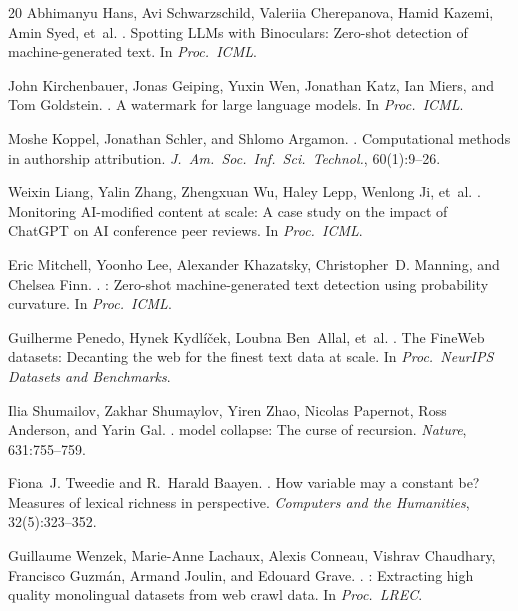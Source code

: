 \documentclass[11pt]{article}
\begin{document}
\begin{thebibliography}{20}
Abhimanyu Hans, Avi Schwarzschild, Valeriia Cherepanova, Hamid Kazemi, Amin Syed, et~al.
.
\newblock Spotting {LLM}s with {B}inoculars: Zero-shot detection of machine-generated text.
\newblock In \emph{Proc.\ ICML}.

John Kirchenbauer, Jonas Geiping, Yuxin Wen, Jonathan Katz, Ian Miers, and Tom Goldstein.
.
\newblock A watermark for large language models.
\newblock In \emph{Proc.\ ICML}.

Moshe Koppel, Jonathan Schler, and Shlomo Argamon.
.
\newblock Computational methods in authorship attribution.
\newblock \emph{J.\ Am.\ Soc.\ Inf.\ Sci.\ Technol.}, 60(1):9--26.

Weixin Liang, Yalin Zhang, Zhengxuan Wu, Haley Lepp, Wenlong Ji, et~al.
.
\newblock Monitoring {AI}-modified content at scale: A case study on the impact of {ChatGPT} on {AI} conference peer reviews.
\newblock In \emph{Proc.\ ICML}.

Eric Mitchell, Yoonho Lee, Alexander Khazatsky, Christopher~D. Manning, and Chelsea Finn.
.
: Zero-shot machine-generated text detection using probability curvature.
\newblock In \emph{Proc.\ ICML}.

Guilherme Penedo, Hynek Kydl{\'i}{\v{c}}ek, Loubna Ben~Allal, et~al.
.
\newblock The {FineWeb} datasets: Decanting the web for the finest text data at scale.
\newblock In \emph{Proc.\ NeurIPS Datasets and Benchmarks}.

Ilia Shumailov, Zakhar Shumaylov, Yiren Zhao, Nicolas Papernot, Ross Anderson, and Yarin Gal.
.
 model collapse: The curse of recursion.
\newblock \emph{Nature}, 631:755--759.

Fiona~J. Tweedie and R.~Harald Baayen.
.
\newblock How variable may a constant be? {M}easures of lexical richness in perspective.
\newblock \emph{Computers and the Humanities}, 32(5):323--352.

Guillaume Wenzek, Marie-Anne Lachaux, Alexis Conneau, Vishrav Chaudhary, Francisco Guzm{\'a}n, Armand Joulin, and Edouard Grave.
.
: Extracting high quality monolingual datasets from web crawl data.
\newblock In \emph{Proc.\ LREC}.


\end{thebibliography}
\end{document}
